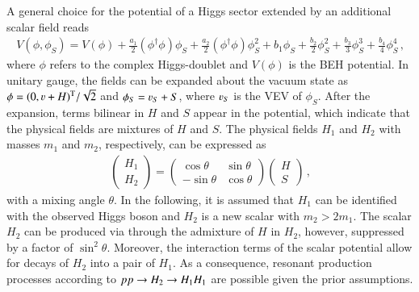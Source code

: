 \begin{description}
  A general choice for the potential of a Higgs sector extended by an additional
  scalar field
  reads~\cite{OConnell:2006rsp,No:2013wsa,Chen:2014ask,DiMicco:2019ngk}
  \begin{align*}
    V(\phi, \phi_{S}) = V(\phi)
    + \frac{a_1}{2} (\phi^\dagger \phi) \phi_{S}
    + \frac{a_2}{2} (\phi^\dagger \phi) \phi_{S}^2
    + b_1 \phi_{S} + \frac{b_2}{2} \phi_{S}^2 + \frac{b_3}{3} \phi_{S}^3 + \frac{b_4}{4} \phi_{S}^4 \,\text{,}
  \end{align*}
  where $\phi$ refers to the complex Higgs-doublet and $V(\phi)$ is the BEH
  potential. In unitary gauge, the fields can be expanded about the vacuum state
  as $\phi = (0, \varv + H)^{\text{T}} / \sqrt{2}$ and
  $\phi_{S} = \varv_{S} + S$, where $\varv_{S}$ is the VEV of $\phi_{S}$. After
  the expansion, terms bilinear in $H$ and $S$ appear in the potential,
  which indicate that the physical fields are mixtures of $H$ and $S$. The
  physical fields $H_1$ and $H_2$ with masses $m_1$ and $m_2$, respectively, can
  be expressed as
  \begin{align*}
    \begin{pmatrix}
      H_1 \\
      H_2
    \end{pmatrix}
    =
    \begin{pmatrix}
      \cos\theta & \sin\theta \\
      -\sin\theta & \cos\theta
    \end{pmatrix}
    \begin{pmatrix}
      H \\
      S
    \end{pmatrix} \,\text{,}
  \end{align*}
  with a mixing angle $\theta$. In the following, it is assumed that $H_1$ can
  be identified with the observed Higgs boson and $H_2$ is a new scalar with
  $m_2 > 2 m_1$.  The scalar $H_2$ can be produced via \ggF through the
  admixture of $H$ in $H_2$, however, suppressed by a factor of
  $\sin^2\theta$. Moreover, the interaction terms of the scalar potential allow
  for decays of $H_2$ into a pair of $H_1$. As a consequence, resonant
  production processes according to $pp \to H_2 \to H_1 H_1$ are possible given
  the prior assumptions.


\end{description}
